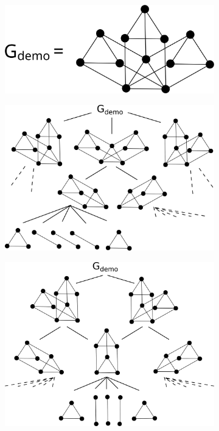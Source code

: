 \ClearMyMinHeight
{}

\begin{figure}\centering%
  \begin{subfigure}{0.4\linewidth}\centering
    \includegraphics[height=\myMinHeight]{img/svg/3xc2c3}
    \caption{}\label{fig:demo_graph:graph}
  \end{subfigure}%
  \hfill
  \begin{subfigure}{0.3\linewidth}\centering
    \includegraphics[height=\myMinHeight]{img/svg/3xc2c3_comdrp}
    \caption{}\label{fig:demo_graph:comdrp}
  \end{subfigure}%
  \hfill
  \begin{subfigure}{0.3\linewidth}\centering
    \includegraphics[height=\myMinHeight]{img/svg/3xc2c3_candrp}

\end{subfigure}
\end{figure}
